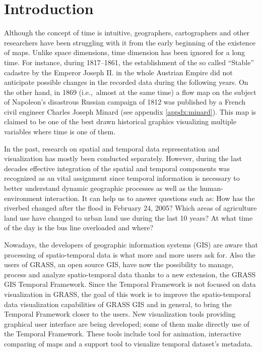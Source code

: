 \documentclass[a4paper,12pt,oneside]{book}
\title{}
\author{Anna Kratochvílová}
\newcommand{\tf}{Temporal Framework\xspace}
\begin{document}
\pagestyle{empty}


\cleardoublepage





\cleardoublepage




\tableofcontents
\cleardoublepage
\pagestyle{fancy}
\chapter*{Introduction}
Although the concept of time is intuitive, geographers, cartographers and other researchers have been
struggling with it from the early beginning of the existence of maps.
Unlike space dimensions, time dimension has been ignored for a long time. For instance,
during 1817--1861, the establishment of the so called ``Stable''  cadastre by the Emperor Joseph II.
in the whole Austrian Empire did not anticipate possible changes
in the recorded data during the following years.
On the other hand, in 1869 (i.e.,\ almost at the same time)
a flow map on the subject of Napoleon's disastrous Russian campaign of 1812 was
published by a French civil engineer Charles Joseph Minard (see appendix \ref{appdx:minard}).
This map is claimed to be
one of the best drawn historical graphics visualizing multiple variables where time is one of them.

In the past, research on spatial and temporal data representation and visualization
has mostly been conducted separately. However, during the last decades
effective integration of the spatial and temporal components was recognized as an vital assignment
since temporal information is necessary to better understand dynamic geographic processes
as well as the human-environment interaction. It can help us to answer questions such as:
How has the riverbed changed after the flood in February 24, 2005?
Which areas of agriculture land use have changed to urban land use during the last 10 years?
At what time of the day is the bus line overloaded and where?

Nowadays, the developers of geographic information systems (GIS) are aware that
processing of spatio-temporal data is what more and more users ask for.
Also the users of GRASS, an open source GIS, have now the possibility to manage,
process and analyze spatio-temporal data thanks to a new extension, the GRASS GIS \tf.
Since the \tf is not focused on data visualization in GRASS, the goal of this work
is to improve the spatio-temporal data visualization capabilities of GRASS GIS and in general,
to bring the \tf closer to the users. New visualization tools providing graphical user interface
are being developed; some of them make directly use of the \tf. These tools include tool
for animation, interactive comparing of maps and a support tool to visualize temporal dataset's metadata.
\end{document}

